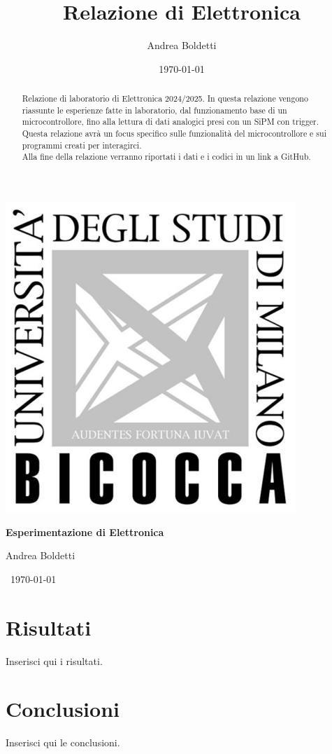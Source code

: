 \documentclass[a4paper]{article}
\title{Relazione di Elettronica}
\author{Andrea Boldetti}
\date{\today}
\begin{document}
\includegraphics[left]{Logo Bicocca.jpeg}

\begin{center}
        {\fontsize{23pt}{23pt}\selectfont\bfseries{}\selectfont Esperimentazione di Elettronica \par}
        \vspace{1cm} %
        {\fontsize{17pt}{22pt}\selectfont{}\selectfont Andrea Boldetti \par}

        \vspace{1cm}
        {\centering\fontsize{20pt}{20pt}\selectfont{}\selectfont \ \today \par}
\end{center}
 \vspace{5cm}

\begin{abstract}
Relazione di laboratorio di Elettronica 2024/2025. In questa relazione vengono riassunte le esperienze fatte in laboratorio, dal funzionamento base di un microcontrollore, fino alla lettura di dati analogici presi con un SiPM con trigger.\\
Questa relazione avrà un focus specifico sulle funzionalità del microcontrollore e sui programmi creati per interagirci.\\
Alla fine della relazione verranno riportati i dati e i codici in un link a GitHub.
\end{abstract}

\newpage
{
    \hypersetup{linkcolor=black}
    \tableofcontents
}
\newpage





\section{Risultati}
Inserisci qui i risultati.

\section{Conclusioni}
Inserisci qui le conclusioni.
\end{document}
